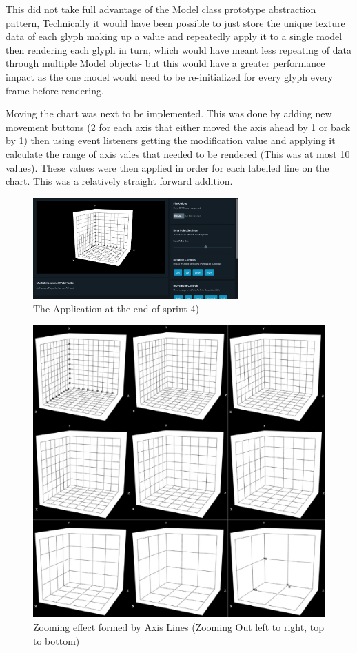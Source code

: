 This did not take full advantage of the Model class prototype abstraction pattern, Technically it would have been possible to just store the unique texture data of each glyph making up a value and repeatedly apply it to a single model then rendering each glyph in turn, which would have meant less repeating of data through multiple Model objects- but this would have a greater performance impact as the one model would need to be re-initialized for every glyph every frame before rendering.

Moving the chart was next to be implemented. This was done by adding new movement buttons (2 for each axis that either moved the axis ahead by 1 or back by 1) then using event listeners getting the modification value and applying it calculate the range of axis vales that needed to be rendered (This was at most 10 values). These values were then applied in order for each labelled line on the chart. This was a relatively straight forward addition.

\begin{figure}[h]
    \centering
    \includegraphics[width=0.7\textwidth]{author-files/figures/pretestScreenshot.png}
    \caption{The Application at the end of sprint 4)}
    \label{fig:oldzoom}
\end{figure}

\begin{figure}[h]
    \centering
    \includegraphics[width=0.8\columnwidth]{author-files/figures/oldzooms.png}
    \caption{Zooming effect formed by Axis Lines (Zooming Out left to right, top to bottom)}
    \label{fig:oldzoom}
\end{figure}

